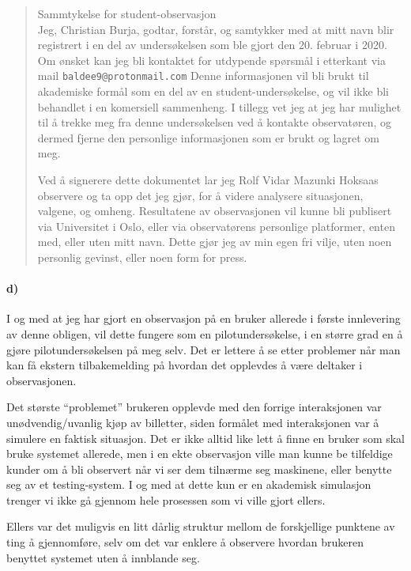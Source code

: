 \documentclass{../../myassignment}
\begin{document}
	\begin{quote}
		Sammtykelse for student-observasjon\\

		Jeg, Christian Burja, godtar, forst{\aa}r, og samtykker med at mitt navn blir registrert i en del av unders{\o}kelsen som ble gjort den 20. februar i 2020. Om ønsket kan jeg bli kontaktet for utdypende spørsmål i etterkant via mail \texttt{baldee9@protonmail.com} Denne informasjonen vil bli brukt til akademiske form{\aa}l som en del av en student-unders{\o}kelse, og vil ikke bli behandlet i en komersiell sammenheng. I tillegg vet jeg at jeg har mulighet til å trekke meg fra denne undersøkelsen ved å kontakte observatøren, og dermed fjerne den personlige informasjonen som er brukt og lagret om meg. 

		Ved {\aa} signerere dette dokumentet lar jeg Rolf Vidar Mazunki Hoksaas observere og ta opp det jeg gj{\o}r, for {\aa} videre analysere situasjonen, valgene, og omheng. Resultatene av observasjonen vil kunne bli publisert via Universitet i Oslo, eller via observatørens personlige platformer, enten med, eller uten mitt navn. Dette gj{\o}r jeg av min egen fri vilje, uten noen personlig gevinst, eller noen form for press. 



	\end{quote}


	\paragraph*{d)}
	I og med at jeg har gjort en observasjon på en bruker allerede i første innlevering av denne obligen, vil dette fungere som en pilotundersøkelse, i en større grad en å gjøre pilotundersøkelsen på meg selv. Det er lettere å se etter problemer når man kan få ekstern tilbakemelding på hvordan det opplevdes å være deltaker i observasjonen. 

	Det største ``problemet'' brukeren opplevde med den forrige interaksjonen var unødvendig/uvanlig kjøp av billetter, siden formålet med interaksjonen var å simulere en faktisk situasjon. Det er ikke alltid like lett å finne en bruker som skal bruke systemet allerede, men i en ekte observasjon ville man kunne be tilfeldige kunder om å bli observert når vi ser dem tilnærme seg maskinene, eller benytte seg av et testing-system. I og med at dette kun er en akademisk simulasjon trenger vi ikke gå gjennom hele prosessen som vi ville gjort ellers. 

	Ellers var det muligvis en litt dårlig struktur mellom de forskjellige punktene av ting å gjennomføre, selv om det var enklere å observere hvordan brukeren benyttet systemet uten å innblande seg.
\end{document}
